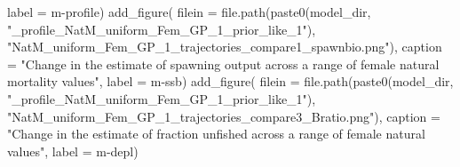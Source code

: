 \documentclass[
  letterpaper,
]{article}
\newenvironment{Shaded}{\begin{snugshade}}{\end{snugshade}}
\newcommand{\AttributeTok}[1]{\textcolor[rgb]{0.77,0.63,0.00}{#1}}
\newcommand{\FunctionTok}[1]{\textcolor[rgb]{0.00,0.00,0.00}{#1}}
\newcommand{\NormalTok}[1]{#1}
\newcommand{\StringTok}[1]{\textcolor[rgb]{0.31,0.60,0.02}{#1}}
\begin{document}
\begin{Shaded}
\begin{Highlighting}[]
\AttributeTok{label =} \StringTok{\textquotesingle{}m{-}profile\textquotesingle{}}\NormalTok{)}
\FunctionTok{add\_figure}\NormalTok{(}
\AttributeTok{filein =} \FunctionTok{file.path}\NormalTok{(}\FunctionTok{paste0}\NormalTok{(model\_dir, }\StringTok{"\_profile\_NatM\_uniform\_Fem\_GP\_1\_prior\_like\_1"}\NormalTok{),  }\StringTok{"NatM\_uniform\_Fem\_GP\_1\_trajectories\_compare1\_spawnbio.png"}\NormalTok{), }
\AttributeTok{caption =} \StringTok{"Change in the estimate of spawning output across a range of female natural mortality values"}\NormalTok{,}
\AttributeTok{label =} \StringTok{\textquotesingle{}m{-}ssb\textquotesingle{}}\NormalTok{)}
\FunctionTok{add\_figure}\NormalTok{(}
\AttributeTok{filein =} \FunctionTok{file.path}\NormalTok{(}\FunctionTok{paste0}\NormalTok{(model\_dir, }\StringTok{"\_profile\_NatM\_uniform\_Fem\_GP\_1\_prior\_like\_1"}\NormalTok{),  }\StringTok{"NatM\_uniform\_Fem\_GP\_1\_trajectories\_compare3\_Bratio.png"}\NormalTok{), }
\AttributeTok{caption =} \StringTok{"Change in the estimate of fraction unfished across a range of female natural values"}\NormalTok{,}
\AttributeTok{label =} \StringTok{\textquotesingle{}m{-}depl\textquotesingle{}}\NormalTok{)}
\end{Highlighting}
\end{Shaded}
\end{document}
